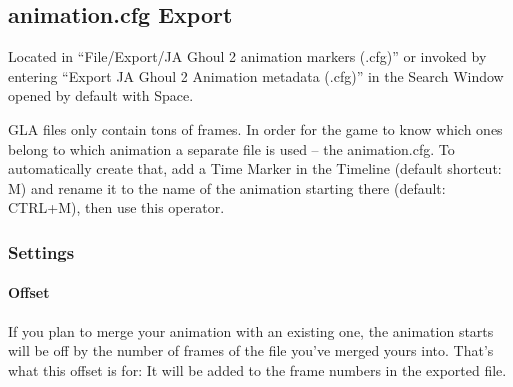 \documentclass[a4paper,10pt]{article}
\begin{document}
 
 \subsection{animation.cfg Export}
 
 Located in ``File/Export/JA Ghoul 2 animation markers (.cfg)'' or invoked by entering ``Export JA Ghoul 2 
 Animation metadata (.cfg)'' in the Search Window opened by default with Space.
 
 GLA files only contain tons of frames. In order for the game to know which ones belong to which animation
 a separate file is used -- the animation.cfg. To automatically create that, add a Time Marker in the Timeline
 (default shortcut: M) and rename it to the name of the animation starting there (default: CTRL+M), then
 use this operator.
 
 \subsubsection*{Settings}
 
 \paragraph*{Offset}
 If you plan to merge your animation with an existing one, the animation starts will be off by the number of
 frames of the file you've merged yours into. That's what this offset is for: It will be added to the frame
 numbers in the exported file.
 
 
\end{document}
